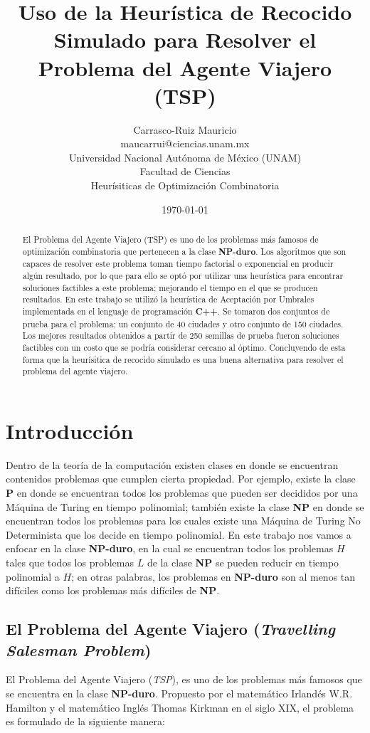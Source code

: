 \documentclass{article}
\title{Uso de la Heurística de Recocido Simulado para Resolver
       el Problema del Agente Viajero (TSP)}
\author{Carrasco-Ruiz Mauricio  \\
	maucarrui@ciencias.unam.mx  \\
        Universidad Nacional Autónoma de México (UNAM) \\
        Facultad de Ciencias \\
        Heurísiticas de Optimización Combinatoria \\
	}
\date{\today}
\newcommand{\tbf}[1]{\textbf{#1}}
\newcommand{\tit}[1]{\textit{#1}}
\begin{document}
  \maketitle


  \begin{abstract}
    El Problema del Agente Viajero (TSP) es uno de los problemas 
    más famosos de optimización combinatoria que pertenecen a la 
    clase \tbf{NP-duro}. Los algoritmos que son capaces de resolver
    este problema toman tiempo factorial o exponencial en producir algún 
    resultado, por lo que para ello se optó por utilizar una heurística
    para encontrar soluciones factibles a este problema; mejorando el
    tiempo en el que se producen resultados. En este trabajo se utilizó 
    la heurística de Aceptación por Umbrales implementada en el lenguaje de
    programación \tbf{C++}. Se tomaron dos conjuntos de prueba para 
    el problema: un conjunto de 40 ciudades y otro conjunto de 150 
    ciudades. Los mejores resultados obtenidos a partir de 250 semillas 
    de prueba fueron soluciones factibles con un costo que se podría 
    considerar cercano al óptimo. Concluyendo de esta forma 
    que la heurísitica de recocido simulado es una buena alternativa 
    para resolver el problema del agente viajero.
  \end{abstract}

  \section{Introducción} \label{intro}
  Dentro de la teoría de la computación existen clases en donde 
  se encuentran contenidos problemas que cumplen cierta propiedad. Por ejemplo,
  existe la clase \tbf{P} en donde se encuentran todos los problemas que 
  pueden ser decididos por una Máquina de Turing en tiempo polinomial;
  también existe la clase \tbf{NP} en donde se encuentran todos los 
  problemas para los cuales existe una Máquina de Turing No Determinista que
  los decide en tiempo polinomial. En este trabajo nos vamos a enfocar
  en la clase \tbf{NP-duro}, en la cual se encuentran todos los 
  problemas $H$ tales que todos los problemas $L$ de la clase \tbf{NP} se 
  pueden reducir en tiempo polinomial a $H$; en otras palabras, los problemas
  en \tbf{NP-duro} son al menos tan difíciles como los problemas más difíciles 
  de \tbf{NP}.

  \subsection{El Problema del Agente Viajero (\tit{Travelling Salesman Problem})}
  \label{TSP}
  El Problema del Agente Viajero (\tit{TSP}), es uno de los problemas más 
  famosos que se encuentra en la clase \tbf{NP-duro}. Propuesto por el 
  matemático Irlandés W.R. Hamilton y el matemático Inglés Thomas Kirkman 
  en el siglo XIX, el problema es formulado de la siguiente manera:
\end{document}
